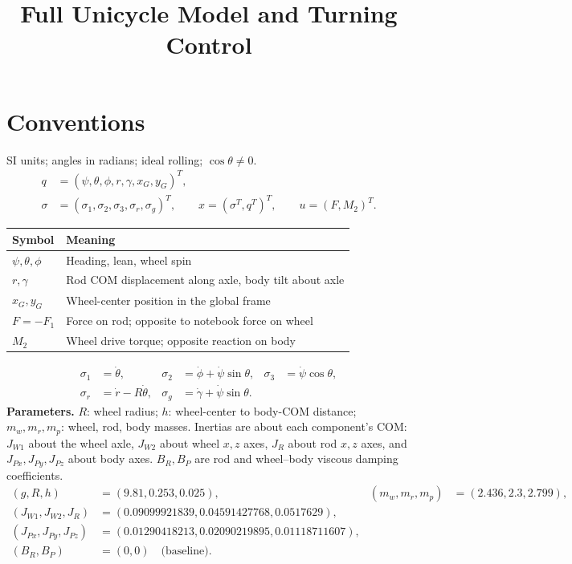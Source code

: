 \documentclass[10pt]{article}
\title{Full Unicycle Model and Turning Control}
\author{}
\date{}
\numberwithin{equation}{section}
\begin{document}
\maketitle
\vspace{-2em}

\section{Conventions}
SI units; angles in radians; ideal rolling; $\cos\theta\ne0$.
\begin{equation}
\begin{aligned}
q&=(\psi,\theta,\phi,r,\gamma,x_G,y_G)^T,\\
\sigma&=(\sigma_1,\sigma_2,\sigma_3,\sigma_r,\sigma_g)^T,
\qquad x=(\sigma^T,q^T)^T,\qquad u=(F,M_2)^T.
\end{aligned}
\end{equation}
\begin{center}
\begin{tabular}{ll}
\toprule
Symbol & Meaning\\\midrule
$\psi,\theta,\phi$ & Heading, lean, wheel spin\\
$r,\gamma$ & Rod COM displacement along axle, body tilt about axle\\
$x_G,y_G$ & Wheel-center position in the global frame\\
$F=-F_1$ & Force on rod; opposite to notebook force on wheel\\
$M_2$ & Wheel drive torque; opposite reaction on body\\
\bottomrule
\end{tabular}
\end{center}
\begin{equation}
\begin{aligned}
\sigma_1&=\dot\theta,&\sigma_2&=\dot\phi+\dot\psi\sin\theta,&
\sigma_3&=\dot\psi\cos\theta,\\
\sigma_r&=\dot r-R\dot\theta,&\sigma_g&=\dot\gamma+\dot\psi\sin\theta.
\end{aligned}
\end{equation}
\textbf{Parameters.} $R$: wheel radius; $h$: wheel-center to body-COM distance;
$m_w,m_r,m_p$: wheel, rod, body masses. Inertias are about each component's COM:
$J_{W1}$ about the wheel axle, $J_{W2}$ about wheel $x,z$ axes,
$J_R$ about rod $x,z$ axes, and $J_{Px},J_{Py},J_{Pz}$ about body axes.
$B_R,B_P$ are rod and wheel--body viscous damping coefficients.
\begin{equation}
\begin{aligned}
(g,R,h)&=(9.81,0.253,0.025),& (m_w,m_r,m_p)&=(2.436,2.3,2.799),\\
(J_{W1},J_{W2},J_R)&=(0.09099921839,0.04591427768,0.0517629),\\
(J_{Px},J_{Py},J_{Pz})&=(0.01290418213,0.02090219895,0.01118711607),\\
(B_R,B_P)&=(0,0)\quad\text{(baseline)}.
\end{aligned}
\end{equation}
\end{document}

